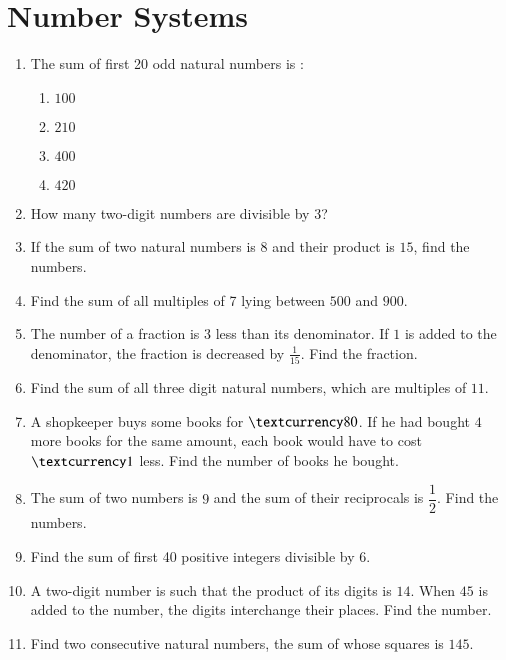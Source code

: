 \documentclass[journal,12pt,onecolumn]{IEEEtran}
\theoremstyle{remark}
\begin{document}
\section{Number Systems}
\begin{enumerate}
\item The sum of first 20 odd natural numbers is :\\
\begin{enumerate}
\item $100$\\
\item $210$\\
\item $400$\\
\item $420$\\
\end{enumerate}
\item How many two-digit numbers are divisible by 3?\\
\item If the sum of two natural numbers is $8$ and their product is $15$, find the numbers.\\
\item Find the sum of all multiples of 7 lying between $500$ and $900$.\\
\item The number of a fraction is $3$ less than its denominator. If $1$ is added to the denominator, the fraction is decreased by $\frac{1}{15}$. Find the fraction.\\

\item Find the sum of all three digit natural numbers, which are multiples of $11$.\\
\item A shopkeeper buys some books for $\textcurrency 80$. If he had bought $4$ more books for the same amount, each book would have to cost $\textcurrency 1$ less. Find the number of books he bought.\\

\item The sum of two numbers is $9$ and the sum of their reciprocals is $\dfrac{1}{2}$. Find the numbers.\\
\item Find the sum of first 40 positive integers divisible by $6$.\\
\item A two-digit number is such that the product of its digits is $14$. When $45$ is added to the number, the digits interchange their places. Find the number.\\
\item Find two consecutive natural numbers, the sum of whose squares is $145$.\\
\end{enumerate}
\end{document}
